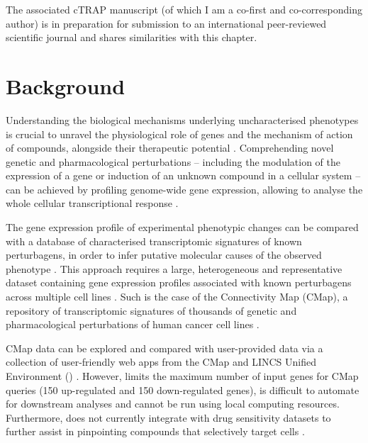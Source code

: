 The associated cTRAP manuscript (of which I am a co-first and co-corresponding author) is in preparation for submission to an international peer-reviewed scientific journal and shares similarities with this chapter.

\section{Background}

Understanding the biological mechanisms underlying uncharacterised phenotypes is crucial to unravel the physiological role of genes and the mechanism of action of compounds, alongside their therapeutic potential \cite{subramanian:2017ul,malta:2018uj,mendez-lucio:2020th,le:2021uq,hughes:2000ww,almeida:2019wh}. Comprehending novel genetic and pharmacological perturbations -- including the modulation of the expression of a gene or induction of an unknown compound in a cellular system -- can be achieved by profiling genome-wide gene expression, allowing to analyse the whole cellular transcriptional response \cite{hughes:2000ww}.

The gene expression profile of experimental phenotypic changes can be compared with a database of characterised transcriptomic signatures of known perturbagens, in order to infer putative molecular causes of the observed phenotype \cite{subramanian:2017ul,hughes:2000ww}. This approach requires a large, heterogeneous and representative dataset containing gene expression profiles associated with known perturbagens across multiple cell lines \cite{hughes:2000ww}. Such is the case of the Connectivity Map (CMap), a repository of transcriptomic signatures of thousands of genetic and pharmacological perturbations of human cancer cell lines \cite{subramanian:2017ul}. %

CMap data can be explored and compared with user-provided data via a collection of user-friendly web apps from the CMap and LINCS Unified Environment () \cite{subramanian:2017ul}. However,  limits the maximum number of input genes for CMap queries (150 up-regulated and 150 down-regulated genes), %
is difficult to automate for downstream analyses and cannot be run using local computing resources. Furthermore,  does not currently integrate with drug sensitivity datasets to further assist in pinpointing compounds that selectively target cells \cite{almeida:2019wh}.

